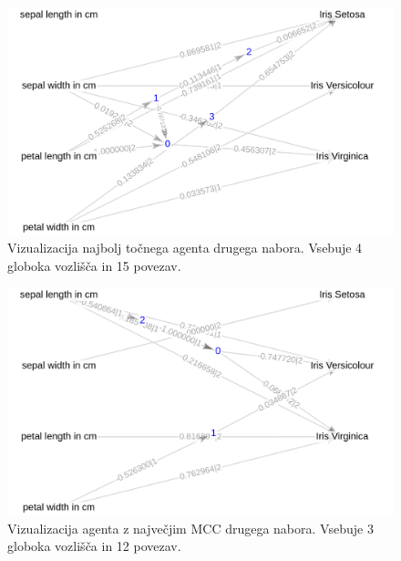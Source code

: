 \begin{figure}[H]
    \begin{center}
        \includegraphics[width=13cm]{iris/2/acc_g}
    \end{center}
    \caption{Vizualizacija najbolj točnega agenta drugega nabora. Vsebuje 4 globoka vozlišča in 15 povezav.}
    \label{fig:iris_acc_2_g}
\end{figure}

\begin{figure}[H]
    \begin{center}
        \includegraphics[width=13cm]{iris/2/mcc_g}
    \end{center}
    \caption{Vizualizacija agenta z največjim MCC drugega nabora. Vsebuje 3 globoka vozlišča in 12 povezav.}
    \label{fig:iris_mcc_2_g}
\end{figure}

